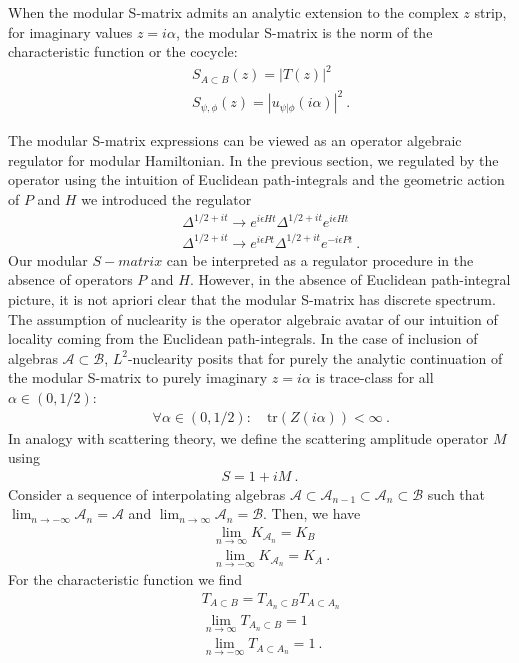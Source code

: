 \documentclass[a4paper,11pt]{article}
\theoremstyle{definition}
\newcommand{\mA}{\mathcal{A}}
\newcommand{\mB}{\mathcal{B}}
\newcommand{\nn}{\nonumber}
\newcommand{\ep}{\epsilon}
\newcommand{\tr}{\text{tr}}
\begin{document}
When the modular S-matrix admits an analytic extension to the complex $z$ strip, for imaginary values $z=i\alpha$, the modular S-matrix is the norm of the characteristic function or the cocycle:
\begin{eqnarray}
&&S_{A\subset B}(z)=|T(z)|^2\nn\\
&&S_{\psi,\phi}(z)=|u_{\psi|\phi}(i\alpha)|^2\ .
\end{eqnarray}

The modular S-matrix expressions can be viewed as an operator algebraic regulator for modular Hamiltonian. In the previous section, we regulated by the operator using the intuition of Euclidean path-integrals and the geometric action of $P$ and $H$ we introduced the regulator 
\begin{eqnarray}
&&\Delta^{1/2+it}\to e^{i \ep Ht} \Delta^{1/2+it}e^{i \ep Ht}\nn\\
&&\Delta^{1/2+it}\to e^{i \ep Pt}\Delta^{1/2+it} e^{-i \ep Pt}\ .
\end{eqnarray}
Our modular $S-matrix$ can be interpreted as a regulator procedure in the absence of operators $P$ and $H$. However, in the absence of Euclidean path-integral picture, it is not apriori clear that the modular S-matrix has discrete spectrum. The assumption of nuclearity is the operator algebraic avatar of our intuition of locality coming from the Euclidean path-integrals. In the case of inclusion of algebras $\mA\subset \mB$, $L^2$-nuclearity posits that for purely the analytic continuation of the modular S-matrix to purely imaginary $z=i\alpha$ is trace-class for all $\alpha\in (0,1/2)$:
\begin{eqnarray}
&&\forall \alpha\in (0,1/2):\quad \tr(Z(i\alpha)) <\infty\ .
\end{eqnarray}
In analogy with scattering theory, we define the scattering amplitude operator $M$ using
\begin{eqnarray}
S=1+i M\ .
\end{eqnarray}
Consider a sequence of interpolating algebras $\mA\subset \mA_{n-1}\subset \mA_n\subset \mB$ such that $\lim_{n\to -\infty}\mA_n=\mA$ and $\lim_{n\to \infty}\mA_n=\mB$. Then,  we have
\begin{eqnarray}
&&\lim_{n\to \infty} K_{\mA_n}=K_B\nn\\
&&\lim_{n\to -\infty} K_{\mA_n}=K_A\ .
\end{eqnarray}
For the characteristic function we find
\begin{eqnarray}
&&T_{A\subset B}=T_{A_n\subset B}T_{A\subset A_n}\nn\\
&&\lim_{n\to \infty}T_{A_n\subset B}=1\nn\\
&&\lim_{n\to -\infty}T_{A\subset A_n}=1\ .
\end{eqnarray}
\end{document}

